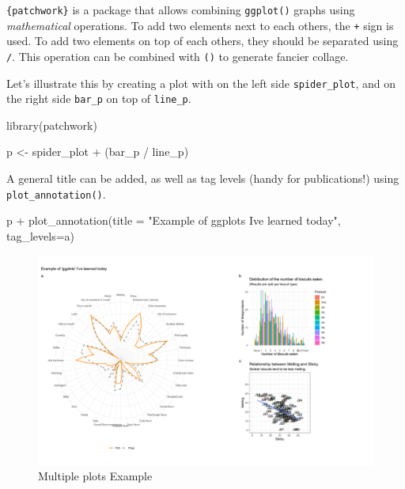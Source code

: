 \documentclass[
]{krantz}
\makeatletter
\newenvironment{Shaded}{\begin{snugshade}}{\end{snugshade}}
\newcommand{\AttributeTok}[1]{\textcolor[rgb]{0.61,0.61,0.61}{#1}}
\newcommand{\FunctionTok}[1]{\textcolor[rgb]{0,0,0}{#1}}
\newcommand{\NormalTok}[1]{#1}
\newcommand{\OtherTok}[1]{\textcolor[rgb]{0.37,0.37,0.37}{#1}}
\newcommand{\SpecialCharTok}[1]{\textcolor[rgb]{0,0,0}{#1}}
\newcommand{\StringTok}[1]{\textcolor[rgb]{0.5,0.5,0.5}{#1}}
\newenvironment{kframe}{%
\medskip{}
\setlength{\fboxsep}{.8em}
 \def\at@end@of@kframe{}%
 \ifinner\ifhmode%
  \def\at@end@of@kframe{\end{minipage}}%
  \begin{minipage}{\columnwidth}%
 \fi\fi%
 \def\FrameCommand##1{\hskip\@totalleftmargin \hskip-\fboxsep
 \colorbox{shadecolor}{##1}\hskip-\fboxsep
     \hskip-\linewidth \hskip-\@totalleftmargin \hskip\columnwidth}%
 \MakeFramed {\advance\hsize-\width
   \@totalleftmargin\z@ \linewidth\hsize
   \@setminipage}}%
 {\par\unskip\endMakeFramed%
 \at@end@of@kframe}
\renewenvironment{Shaded}{\begin{kframe}}{\end{kframe}}
\makeatother
\begin{document}
\texttt{\{patchwork\}} is a package that allows combining \texttt{ggplot()} graphs using \emph{mathematical} operations. To add two elements next to each others, the \texttt{+} sign is used. To add two elements on top of each others, they should be separated using \texttt{/}. This operation can be combined with \texttt{()} to generate fancier collage.

Let's illustrate this by creating a plot with on the left side \texttt{spider\_plot}, and on the right side \texttt{bar\_p} on top of \texttt{line\_p}.

\begin{Shaded}
\begin{Highlighting}[]
\FunctionTok{library}\NormalTok{(patchwork)}

\NormalTok{p }\OtherTok{\textless{}{-}}\NormalTok{ spider\_plot }\SpecialCharTok{+}\NormalTok{ (bar\_p }\SpecialCharTok{/}\NormalTok{ line\_p)}
\end{Highlighting}
\end{Shaded}

A general title can be added, as well as tag levels (handy for publications!) using \texttt{plot\_annotation()}.

\begin{Shaded}
\begin{Highlighting}[]
\NormalTok{p }\SpecialCharTok{+} \FunctionTok{plot\_annotation}\NormalTok{(}\AttributeTok{title =} \StringTok{"Example of \textquotesingle{}ggplots\textquotesingle{} I\textquotesingle{}ve learned today"}\NormalTok{, }
                    \AttributeTok{tag\_levels=}\StringTok{\textquotesingle{}a\textquotesingle{}}\NormalTok{)}
\end{Highlighting}
\end{Shaded}

\begin{figure}

{\centering \includegraphics[width=0.9\linewidth]{images/multiplePlot} 

}

\caption{Multiple plots Example}\label{fig:unnamed-chunk-148}
\end{figure}
\end{document}
